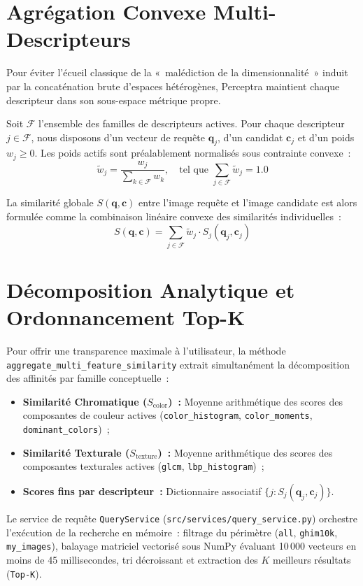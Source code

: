 \section{Agrégation Convexe Multi-Descripteurs}

Pour éviter l'écueil classique de la «~malédiction de la dimensionnalité~» induit par la concaténation brute d'espaces hétérogènes, Perceptra maintient chaque descripteur dans son sous-espace métrique propre.

Soit $\mathcal{F}$ l'ensemble des familles de descripteurs actives. Pour chaque descripteur $j \in \mathcal{F}$, nous disposons d'un vecteur de requête $\mathbf{q}_j$, d'un candidat $\mathbf{c}_j$ et d'un poids $w_j \ge 0$. Les poids actifs sont préalablement normalisés sous contrainte convexe~:
\begin{equation}
\tilde{w}_j = \frac{w_j}{\sum_{k \in \mathcal{F}} w_k}, \quad \text{tel que } \sum_{j \in \mathcal{F}} \tilde{w}_j = 1.0
\end{equation}

La similarité globale $S(\mathbf{q}, \mathbf{c})$ entre l'image requête et l'image candidate est alors formulée comme la combinaison linéaire convexe des similarités individuelles~:
\begin{equation}
S(\mathbf{q}, \mathbf{c}) = \sum_{j \in \mathcal{F}} \tilde{w}_j \cdot S_j(\mathbf{q}_j, \mathbf{c}_j)
\end{equation}

\section{Décomposition Analytique et Ordonnancement Top-K}

Pour offrir une transparence maximale à l'utilisateur, la méthode \texttt{aggregate\_multi\_feature\_similarity} extrait simultanément la décomposition des affinités par famille conceptuelle~:
\begin{itemize}
    \item \textbf{Similarité Chromatique ($S_{\text{color}}$)~:} Moyenne arithmétique des scores des composantes de couleur actives (\texttt{color\_histogram}, \texttt{color\_moments}, \texttt{dominant\_colors})~;
    \item \textbf{Similarité Texturale ($S_{\text{texture}}$)~:} Moyenne arithmétique des scores des composantes texturales actives (\texttt{glcm}, \texttt{lbp\_histogram})~;
    \item \textbf{Scores fins par descripteur~:} Dictionnaire associatif $\{j: S_j(\mathbf{q}_j, \mathbf{c}_j)\}$.
\end{itemize}

Le service de requête \texttt{QueryService} (\texttt{src/services/query\_service.py}) orchestre l'exécution de la recherche en mémoire~: filtrage du périmètre (\texttt{all}, \texttt{ghim10k}, \texttt{my\_images}), balayage matriciel vectorisé sous NumPy évaluant 10\,000 vecteurs en moins de 45 millisecondes, tri décroissant et extraction des $K$ meilleurs résultats (\texttt{Top-K}).
